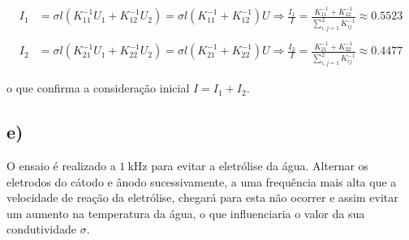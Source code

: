 \documentclass[11pt, a4paper, titlepage, portuguese]{article}
\begin{document}
		\begin{align*}
				I_1 &= \sigma l \left(K^{-1}_{11}U_1 + K^{-1}_{12}U_2\right) = \sigma l \left(K^{-1}_{11} + K^{-1}_{12} \right)	U \Rightarrow \frac{I_1}{I} = \frac{K^{-1}_{11} + K^{-1}_{12}} {\sum\limits_{i,j=1}^{2} K^{-1}_{ij}}
				\approx 0.5523 \\ \\
				I_2 &= \sigma l \left(K^{-1}_{21}U_1 + K^{-1}_{22}U_2\right) = \sigma l \left(K^{-1}_{21} + K^{-1}_{22} \right)	U \Rightarrow \frac{I_2}{I} = \frac{K^{-1}_{21} + K^{-1}_{22}} {\sum\limits_{i,j=1}^{2} K^{-1}_{ij}}
				\approx 0.4477
		\end{align*}

		\par
		o que confirma a consideração inicial $I = I_1 + I_2$.

	\subsection{e)}
		\par
		O ensaio é realizado a $\SI{1}{\kilo\hertz}$ para evitar a eletrólise da água. Alternar os eletrodos do cátodo e ânodo sucessivamente, a uma frequência mais alta que a velocidade de reação da eletrólise, chegará para esta não ocorrer e assim evitar um aumento na temperatura da água, o que influenciaria o valor da sua condutividade $\sigma$.
\end{document}

